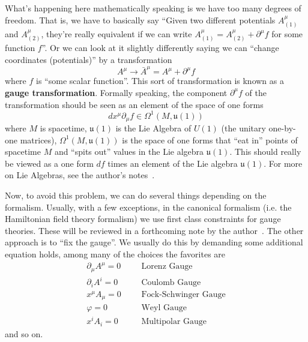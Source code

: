 What's happening here mathematically speaking is we have too many
degrees of freedom. That is, we have to basically say ``Given two
different potentials $A^{\mu}_{(1)}$ and $A^{\mu}_{(2)}$, they're
really equivalent if we can write
$A^{\mu}_{(1)}=A^{\mu}_{(2)}+\partial^{\mu}f$ for some function
$f$''. Or we can look at it slightly differently saying we can
``change coordinates (potentials)'' by a transformation
\begin{equation}%
A^{\mu}\to\bar{A}^{\mu}=A^{\mu}+\partial^{\mu}f
\end{equation}
where $f$ is ``some scalar function''. This sort of
transformation is known as a \textbf{gauge
  transformation}. Formally speaking, the component
$\partial^{\mu}f$ of the transformation should be seen as an
element of the space of one forms
\begin{equation}%
dx^{\mu}\partial_{\mu}f\in\Omega^{1}\left(M,\mathfrak{u}(1)\right)
\end{equation}
where $M$ is spacetime, $\mathfrak{u}(1)$ is the Lie Algebra of $U(1)$ (the unitary
one-by-one matrices), $\Omega^{1}(M,\mathfrak{u}(1))$ is the
space of one forms that ``eat in'' points of spacetime $M$ and
``spits out'' values in the Lie algebra $\mathfrak{u}(1)$. This
should really be viewed as a one form $df$ times an element of
the Lie algebra $\mathfrak{u}(1)$. For more on Lie Algebras, see
the author's notes~\cite{notesOnLieAlgebras}.

Now, to avoid this problem, we can do several things depending on
the formalism. Usually, with a few exceptions, in the canonical
formalism (i.e. the Hamiltonian field theory formalism) we use
first class constraints for gauge theories. These will be
reviewed in a forthcoming note by the
author~\cite{constraints}. The other approach is to ``fix the
gauge''. We usually do this by demanding some additional
equation holds, among many of the choices the favorites are
\begin{subequations}
\begin{align}
\partial_{\mu}A^{\mu} = 0 &&& \text{Lorenz Gauge}\\
\partial_{i}A^{i} = 0 &&& \text{Coulomb Gauge}\\
x^{\mu}A_{\mu} = 0 &&& \text{Fock-Schwinger Gauge}\\
\varphi = 0 &&& \text{Weyl Gauge}\\
x^{i}A_{i} = 0 &&& \text{Multipolar Gauge}
\end{align}
\end{subequations}
and so on.

